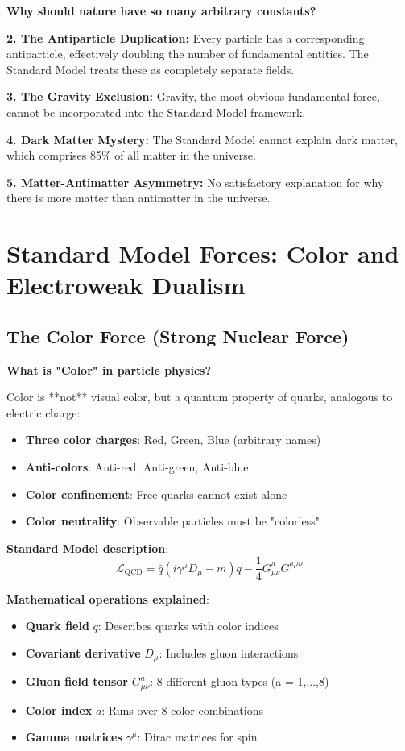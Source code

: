 \documentclass[12pt,a4paper]{article}
\newcommand{\Lag}{\mathcal{L}}
\theoremstyle{definition}
\theoremstyle{remark}
\begin{document}
	\textbf{Why should nature have so many arbitrary constants?}
	
	\textbf{2. The Antiparticle Duplication:}
	Every particle has a corresponding antiparticle, effectively doubling the number of fundamental entities. The Standard Model treats these as completely separate fields.
	
	\textbf{3. The Gravity Exclusion:}
	Gravity, the most obvious fundamental force, cannot be incorporated into the Standard Model framework.
	
	\textbf{4. Dark Matter Mystery:}
	The Standard Model cannot explain dark matter, which comprises 85\% of all matter in the universe.
	
	\textbf{5. Matter-Antimatter Asymmetry:}
	No satisfactory explanation for why there is more matter than antimatter in the universe.
	
	\section{Standard Model Forces: Color and Electroweak Dualism}
	
	\subsection{The Color Force (Strong Nuclear Force)}
	
	\textbf{What is "Color" in particle physics?}
	
	Color is **not** visual color, but a quantum property of quarks, analogous to electric charge:
	
	\begin{itemize}
		\item \textbf{Three color charges}: Red, Green, Blue (arbitrary names)
		\item \textbf{Anti-colors}: Anti-red, Anti-green, Anti-blue
		\item \textbf{Color confinement}: Free quarks cannot exist alone
		\item \textbf{Color neutrality}: Observable particles must be "colorless"
	\end{itemize}
	
	\textbf{Standard Model description}:
	\begin{equation}
		\Lag_{\text{QCD}} = \bar{q} (i\gamma^\mu D_\mu - m) q - \frac{1}{4} G_{\mu\nu}^a G^{a\mu\nu}
	\end{equation}
	
	\textbf{Mathematical operations explained}:
	\begin{itemize}
		\item \textbf{Quark field} $q$: Describes quarks with color indices
		\item \textbf{Covariant derivative} $D_\mu$: Includes gluon interactions
		\item \textbf{Gluon field tensor} $G_{\mu\nu}^a$: 8 different gluon types (a = 1,...,8)
		\item \textbf{Color index} $a$: Runs over 8 color combinations
		\item \textbf{Gamma matrices} $\gamma^\mu$: Dirac matrices for spin
	\end{itemize}
	
\end{document}
